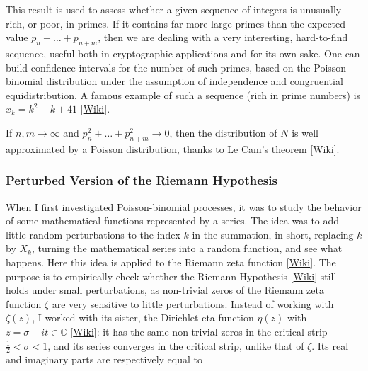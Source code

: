 \documentclass[10pt]{article}
\begin{document}
This result is used to assess whether a given sequence of integers is unusually rich, or poor, in primes. If it contains far more large primes than the
expected value $p_n+\dots+p_{n+m}$, then we are dealing with a very interesting, hard-to-find sequence, useful both in cryptographic applications and for its own sake. One can build confidence intervals for the number of such primes, based on the Poisson-binomial distribution under the assumption of independence and congruential equidistribution. A famous example of such a sequence (rich in prime numbers) is  $x_k=k^2-k+41$ [\href{https://en.wikipedia.org/wiki/Ulam_spiral}{Wiki}].

If $n,m\rightarrow\infty$ and $p_n^2+\dots+p_{n+m}^2\rightarrow 0$, then the distribution of $N$ is well approximated by a Poisson distribution, thanks to Le Cam's theorem
 [\href{https://en.wikipedia.org/wiki/Le_Cam's_theorem}{Wiki}]. 


\subsubsection{Perturbed Version of the Riemann Hypothesis}\label{rh}

When I first investigated Poisson-binomial processes, it was to study the behavior of some mathematical functions represented by a series. The idea was to add little random perturbations to the index $k$ in the summation, in short, replacing $k$ by $X_k$, turning the mathematical series into a 
\textcolor{index}{random function}, and see what happens. Here this idea is applied to the \textcolor{index}{Riemann zeta function} [\href{https://en.wikipedia.org/wiki/Riemann_zeta_function}{Wiki}]. The purpose is to empirically check whether the Riemann Hypothesis 
[\href{https://en.wikipedia.org/wiki/Riemann_hypothesis}{Wiki}] still holds under small perturbations, as non-trivial zeros of the Riemann zeta function $\zeta$ are very sensitive to little perturbations. Instead of working with $\zeta(z)$, I worked with its sister, the \textcolor{index}{Dirichlet eta function} $\eta(z)$ with $z=\sigma + it \in \mathbb{C}$ 
[\href{https://en.wikipedia.org/wiki/Dirichlet_eta_function}{Wiki}]: it has the same non-trivial zeros in the critical strip $\frac{1}{2} < \sigma < 1$, and its series converges in the critical strip, unlike that of $\zeta$. Its real and imaginary parts are respectively equal to
\end{document}
